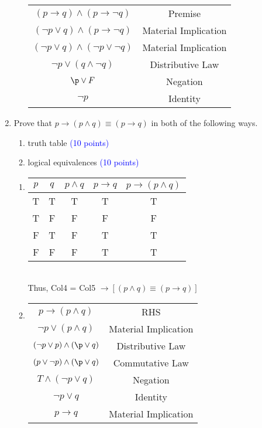 \documentclass{article}
\newcommand{\pt}[1]{\textcolor{blue}{(#1 points)}}
\begin{document}
\begin{enumerate}
\begin{solution}
\begin{enumerate}
\begin{tabular}{c|c}
            $(p \rightarrow q) \land (p \rightarrow \neg q)$ &  Premise\\
            $(\neg p \lor q) \land (p \rightarrow \neg q)$ &  Material Implication\\
            $(\neg p \lor q) \land (\neg p \lor \neg q)$ &  Material Implication\\
            $\neg p \lor (q \land \neg q)$ & Distributive Law\\
            $\p \lor F$ & Negation\\
            $\neg p$ & Identity
        \end{tabular}
    \end{enumerate}
    \end{solution}
    
    
    \item Prove that $p\rightarrow(p\wedge q) \equiv (p \rightarrow q)$ in both of the following ways.
    \begin{enumerate}
        \item truth table \pt{10}
        \item logical equivalences \pt{10}
    \end{enumerate}
    \begin{solution}
    \begin{enumerate}
        \item \begin{tabular}{c|c|c|c|c}
             $p$ & $q$ & $p \land q$ & $p \rightarrow q$ & $p \rightarrow (p \land q)$ \\
             \hline
             T & T & T & T & T\\
             T & F & F & F & F\\
             F & T & F & T & T\\
             F & F & F & T & T\\
        \end{tabular} \\
        Thus, Col4 = Col5 $\rightarrow [(p\wedge q) \equiv (p \rightarrow q)]$
        \item \begin{tabular}{c|c}
             $p \rightarrow (p \land q)$ & RHS \\
             $\neg p \lor (p \land q)$ & Material Implication\\
             $(\neg p \lor p) \land (\p \lor q)$ & Distributive Law\\
             $(p \lor \neg p) \land (\p \lor q)$ & Commutative Law\\
             $T \land (\neg p \lor q)$ & Negation\\
             $\neg p \lor q$ & Identity \\
             $p \rightarrow q$ & Material Implication
             \end{tabular}
        \end{enumerate}
    \end{solution}
    
    
\end{enumerate}
\end{document}
